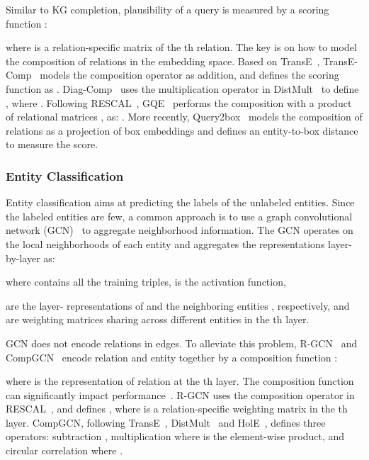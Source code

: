 \documentclass[10pt,journal,compsoc]{IEEEtran}
\begin{document}
Similar to KG completion,
plausibility of a query  
is measured
by
a scoring function 
\cite{guu2015traversing,hamilton2018embedding}:

where  is a relation-specific matrix of the th relation.
The key is on how to model the composition of relations in the embedding space.
Based on TransE~\cite{bordes2013translating},
TransE-Comp~\cite{guu2015traversing}
models the composition operator as addition, and 
defines
the scoring function 
as
.
Diag-Comp~\cite{guu2015traversing}
uses the multiplication operator in DistMult~\cite{yang2014embedding} to define
,
where .
Following RESCAL~\cite{nickel2011three},
GQE~\cite{hamilton2018embedding} 
performs
the composition with a product of relational matrices
, as:
.
More recently,
Query2box~\cite{ren2019query2box} models the composition of relations as a projection of box embeddings
and defines an entity-to-box distance to measure the score.



\subsubsection{Entity Classification}
\label{sssec:entclass}

Entity classification aims at predicting the labels of the unlabeled entities.
Since the labeled entities are few, a common approach is to 
use a graph convolutional network
(GCN)~\cite{kipf2016semi,gilmer2017neural} 
to aggregate neighborhood information.
The GCN
operates on the local neighborhoods of each entity
and aggregates the representations 
layer-by-layer as:

where 
 contains all the training triples,
 is the activation function,

are 
the 
layer-
representations of  and the  neighboring entities ,
respectively,
and  are weighting matrices sharing across different entities
in the th layer.

GCN does not encode relations in edges. To alleviate this problem,
R-GCN~\cite{schlichtkrull2018modeling} and CompGCN~\cite{vashishth2019composition}
encode relation  
and entity  
together by a
composition function :

where 
 is the representation of relation  
at the th layer.
The composition function  
can significantly impact performance~\cite{vashishth2019composition}.
R-GCN 
uses the composition operator in RESCAL~\cite{nickel2011three}, and
defines
,
where  is a relation-specific weighting matrix in the th layer.
CompGCN,
following TransE~\cite{bordes2013translating}, DistMult~\cite{yang2014embedding}
and HolE~\cite{nickel2016holographic}, 
defines
three operators:
subtraction , 
multiplication
 where
 is the 
element-wise product,
and circular correlation  where .
\end{document}
